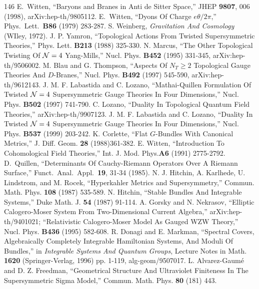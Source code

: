 \begin{thebibliography}{146}
 E.~Witten, ``Baryons and Branes in Anti de Sitter Space,'' JHEP \textbf{9807}, 006 (1998), arXiv:hep-th/9805112.
 E.~Witten, ``Dyons Of Charge $e\theta/ 2 \pi$,'' Phys.\ Lett.\ \textbf{B86} (1979) 283-287.
 S. Weinberg, \emph{Gravitation And Cosmology} (WIley, 1972).
 J. P. Yamron, ``Topological Actions {}From Twisted Supersymmetric Theories,'' Phys. Lett. \textbf{B213} (1988) 325-330.
 N. Marcus, ``The Other Topological Twisting Of ${\cal N}=4$ Yang-Mills,'' Nucl. Phys. \textbf{B452} (1995) 331-345, arXiv:hep-th/9506002.
 M. Blau and G. Thompson, ``Aspects Of $N_T\geq 2$ Topological Gauge Theories And $D$-Branes,'' Nucl. Phys. \textbf{B492} (1997) 545-590, arXiv:hep-th/9612143.
 J. M. F. Labastida and C. Lozano, ``Mathai-Quillen Formulation Of Twisted ${\EUN}=4$ Supersymmetric Gauge Theories In Four Dimensions,'' Nucl. Phys. \textbf{B502} (1997) 741-790.
 C. Lozano, ``Duality In Topological Quantum Field Theories,'' arXiv:hep-th/9907123.
 J. M. F. Labastida and C. Lozano, ``Duality In Twisted ${\EUN}=4$ Supersymmetric Gauge Theories In Four Dimensions,'' Nucl. Phys. \textbf{B537} (1999) 203-242.
 K. Corlette, ``Flat $G$-Bundles With Canonical Metrics,'' J. Diff. Geom. \textbf{28} (1988)361-382.
 E. Witten, ``Introduction To Cohomological Field Theories,'' Int. J. Mod. Phys.\textbf{A6} (1991) 2775-2792.
 D.~Quillen, ``Determinants Of Cauchy-Riemann Operators Over A Riemann Surface,'' Funct.\ Anal.\ Appl.\ \textbf{19}, 31-34 (1985).
 N. J. Hitchin, A. Karlhede, U. Lindstrom, and M. Rocek, ``Hyperkahler Metrics and Supersymmetry,'' Commun. Math. Phys. \textbf{108} (1987) 535-589.
 N. Hitchin, ``Stable Bundles And Integrable Systems,'' Duke Math. J. \textbf{54} (1987) 91-114.
 A. Gorsky and N. Nekrasov, ``Elliptic Calogero-Moser System From Two-Dimensional Current Algebra,'' arXiv:hep-th/9401021; ``Relativistic Calogero-Moser Model As Gauged WZW Theory,'' Nucl. Phys. \textbf{B436} (1995) 582-608.
 R. Donagi and E. Markman, ``Spectral Covers, Algebraically Completely Integrable Hamiltonian Systems, And Moduli Of Bundles,'' in \emph{Integrable Systems And Quantum Groups}, Lecture Notes in Math. \textbf{1620} (Springer-Verlag, 1996) pp. 1-119, alg-geom/9507017.
 L. Alvarez-Gaum\'e and D. Z. Freedman, ``Geometrical Structure And Ultraviolet Finiteness In The Supersymmetric Sigma Model,'' Commun. Math. Phys. \textbf{80} (181) 443.

\end{thebibliography}
